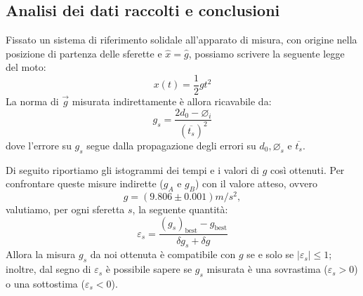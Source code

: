 \documentclass{article}
\newcommand*{\diam}{\varnothing}
\newcommand*{\best}[1]{{#1}_\text{best}}
\newcommand*{\bestp}[1]{{\left(#1\right)}_\text{best}}
\newcommand*{\errrel}[1]{\frac{\delta #1}{{#1}_\text{best}}}
\begin{document}
\subsection{Analisi dei dati raccolti e conclusioni}
Fissato un sistema di riferimento solidale all'apparato di misura, con origine
nella posizione di partenza delle sferette e $\hat{x} = \hat{g}$, possiamo
scrivere la seguente legge del moto:
\[x(t) = \frac{1}{2}g t^2\]
La norma di $\vec{g}$ misurata indirettamente è allora ricavabile da:
\begin{equation}\label{eq:1}
    g_s = \frac{2d_0 - \diam_i}{\left(\overline{t_s}\right)^2}
\end{equation}
dove l'errore su $g_s$ segue dalla propagazione degli errori su $d_0,\diam_s$ e
$\overline{t_s}$.

Di seguito riportiamo gli istogrammi dei tempi e i valori di $g$ così ottenuti.
Per confrontare queste misure indirette ($g_A$ e $g_B$) con il valore atteso, ovvero
\[g=\left(9.806\pm0.001\right)\unit{m\per s^2},\]valutiamo, per ogni
sferetta $s$, la seguente quantità:\[
    \varepsilon_s = \frac{ \bestp{g_s}-\best{g} }
                         { \delta g_s + \delta g }
\] Allora la misura $g_s$ da noi ottenuta è compatibile con $g$ se e solo se
$\left|\varepsilon_s\right|\le1$; inoltre, dal segno di $\varepsilon_s$ è possibile
sapere se $g_s$ misurata è una sovrastima ($\varepsilon_s>0$) o una sottostima
($\varepsilon_s<0$).
\end{document}

